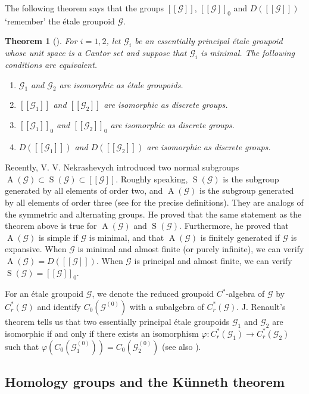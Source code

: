 \documentclass[11pt]{article}
\newtheorem{theorem}{Theorem}[section]
\theoremstyle{definition}
\numberwithin{equation}{section}
\renewcommand{\phi}{\varphi}
\newcommand{\A}{\operatorname{A}}
\renewcommand{\S}{\operatorname{S}}
\newcommand{\G}{\mathcal{G}}
\begin{document}
The following theorem says that 
the groups $[[\G]]$, $[[\G]]_0$ and $D([[\G]])$ `remember' 
the \'etale groupoid $\G$. 

\begin{theorem}[{\cite[Theorem 3.10]{M15crelle}}]
For $i=1,2$, let $\G_i$ be an essentially principal \'etale groupoid 
whose unit space is a Cantor set 
and suppose that $\G_i$ is minimal. 
The following conditions are equivalent. 
\begin{enumerate}
\item $\G_1$ and $\G_2$ are isomorphic as \'etale groupoids. 
\item $[[\G_1]]$ and $[[\G_2]]$ are isomorphic as discrete groups. 
\item $[[\G_1]]_0$ and $[[\G_2]]_0$ are isomorphic as discrete groups. 
\item $D([[\G_1]])$ and $D([[\G_2]])$ are isomorphic as discrete groups. 
\end{enumerate}
\end{theorem}

Recently, V. V. Nekrashevych \cite{Ne15} introduced two normal subgroups 
$\A(\G)\subset\S(\G)\subset[[\G]]$. 
Roughly speaking, 
$\S(\G)$ is the subgroup generated by all elements of order two, 
and $\A(\G)$ is the subgroup generated by all elements of order three 
(see \cite{Ne15} for the precise definitions). 
They are analogs of the symmetric and alternating groups. 
He proved that 
the same statement as the theorem above is true for $\A(\G)$ and $\S(\G)$. 
Furthermore, he proved that $\A(\G)$ is simple if $\G$ is minimal, 
and that $\A(\G)$ is finitely generated if $\G$ is expansive. 
When $\G$ is minimal and almost finite (or purely infinite), 
we can verify $\A(\G)=D([[\G]])$. 
When $\G$ is principal and almost finite, 
we can verify $\S(\G)=[[\G]]_0$. 

For an \'etale groupoid $\G$, 
we denote the reduced groupoid $C^*$-algebra of $\G$ by $C^*_r(\G)$ and 
identify $C_0(\G^{(0)})$ with a subalgebra of $C^*_r(\G)$. 
J. Renault's theorem \cite[Theorem 5.9]{R08Irish} tells us that 
two essentially principal \'etale groupoids $\G_1$ and $\G_2$ are isomorphic 
if and only if there exists an isomorphism $\phi:C^*_r(\G_1)\to C^*_r(\G_2)$ 
such that $\phi(C_0(\G_1^{(0)}))=C_0(\G_2^{(0)})$ 
(see also \cite[Theorem 5.1]{M12PLMS}). 




\subsection{Homology groups and the K\"unneth theorem}
\end{document}
